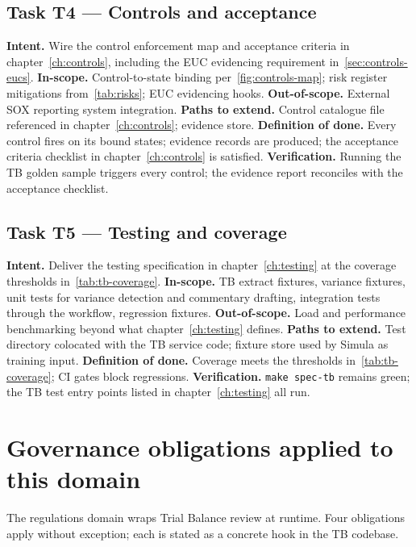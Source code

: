\subsection*{Task T4 --- Controls and acceptance}
\textbf{Intent.} Wire the control enforcement map and acceptance
criteria in chapter~\ref{ch:controls}, including the EUC evidencing
requirement in~\ref{sec:controls-eucs}.
\textbf{In-scope.} Control-to-state binding per~\ref{fig:controls-map};
risk register mitigations from~\ref{tab:risks}; EUC evidencing hooks.
\textbf{Out-of-scope.} External SOX reporting system integration.
\textbf{Paths to extend.} Control catalogue file referenced in
chapter~\ref{ch:controls}; evidence store.
\textbf{Definition of done.} Every control fires on its bound
states; evidence records are produced; the acceptance criteria
checklist in chapter~\ref{ch:controls} is satisfied.
\textbf{Verification.} Running the TB golden sample triggers every
control; the evidence report reconciles with the acceptance
checklist.

\subsection*{Task T5 --- Testing and coverage}
\textbf{Intent.} Deliver the testing specification in
chapter~\ref{ch:testing} at the coverage thresholds
in~\ref{tab:tb-coverage}.
\textbf{In-scope.} TB extract fixtures, variance fixtures, unit
tests for variance detection and commentary drafting, integration
tests through the workflow, regression fixtures.
\textbf{Out-of-scope.} Load and performance benchmarking beyond what
chapter~\ref{ch:testing} defines.
\textbf{Paths to extend.} Test directory colocated with the TB
service code; fixture store used by Simula as training input.
\textbf{Definition of done.} Coverage meets the thresholds
in~\ref{tab:tb-coverage}; CI gates block regressions.
\textbf{Verification.} \texttt{make spec-tb} remains green; the TB
test entry points listed in chapter~\ref{ch:testing} all run.


\section{Governance obligations applied to this domain}
\label{sec:agent-governance}
The regulations domain wraps Trial Balance review at runtime. Four
obligations apply without exception; each is stated as a concrete
hook in the TB codebase.

